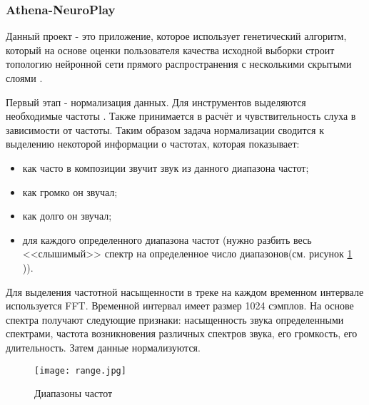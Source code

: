 \subsubsection {Athena-NeuroPlay}
Данный проект  - это приложение, которое использует генетический алгоритм, который на основе оценки пользователя качества исходной выборки строит топологию нейронной сети прямого распространения с несколькими скрытыми слоями \cite{athena}.

Первый этап -  нормализация данных. Для инструментов выделяются необходимые частоты . Также принимается в расчёт и чувствительность слуха в зависимости от частоты.
Таким образом задача нормализации сводится к выделению некоторой информации о частотах, которая показывает:
\begin{itemize}
\item как часто в композиции звучит звук из данного диапазона частот;
\item как громко он звучал;
\item как долго он звучал;
\item для каждого определенного диапазона частот (нужно разбить весь <<слышимый>> спектр на определенное число диапазонов(см. рисунок \ref{fig:domain:athena:range} )).
\end{itemize}




Для выделения частотной насыщенности в треке на каждом временном интервале используется FFT. Временной интервал имеет размер 1024 сэмплов. На основе спектра получают следующие признаки: насыщенность звука определенными спектрами, частота возникновения различных спектров звука, его громкость, его длительность. Затем данные нормализуются.

\begin{figure}[h]
\centering
  \texttt{[image: range.jpg]}  
  \caption{Диапазоны  частот}
  \label{fig:domain:athena:range}
\end{figure}

